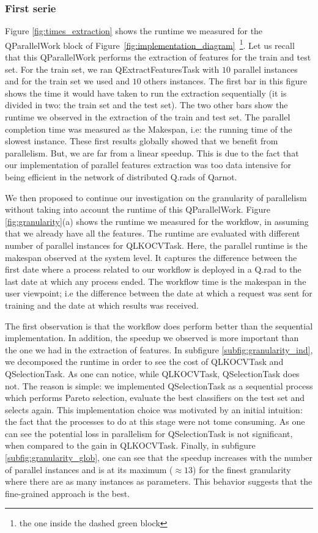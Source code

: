 \documentclass[10pt, conference, compsocconf]{IEEEtran}
\begin{document}
\subsubsection{First serie}

Figure \ref{fig:times_extraction} shows the runtime we measured for the QParallelWork block of 
Figure~\ref{fig:implementation_diagram}~\footnote{the one inside the dashed green block}. 
Let us recall that this QParallelWork performs the extraction of features  for the train and test set. 
For the train set, we ran QExtractFeaturesTask with $10$ parallel instances and for the train set we used and $10$ others instances. 
The first bar in this figure shows the time it would have taken to run the extraction sequentially (it is divided in two: the train set and the test set). The two other bars show the runtime we observed in the extraction of the train and test set. The parallel completion time was 
measured as the Makespan, i.e: the running time of the slowest instance. These first results globally showed that we benefit from parallelism. 
But, we are far from a linear speedup. This is due to the fact that our implementation of parallel features extraction 
was too data intensive for being efficient in the network of distributed Q.rads of Qarnot. 

We then proposed to continue our investigation on the granularity of parallelism without taking into account the runtime 
of this QParallelWork. Figure \ref{fig:granularity}(a) shows the runtime we measured for the workflow, in assuming that we already 
have all the features. The runtime are evaluated  with different number of parallel instances for QLKOCVTask. Here, the parallel runtime 
is the makespan observed at the system level. It captures the difference between the first date where a process related to our 
workflow is deployed in a Q.rad to the last date at which any process ended. 
The workflow time is the makespan in the user viewpoint; i.e the difference between the date at which a request was sent for training 
and the date at which results was received. 

The first observation is that the workflow does perform better than the sequential implementation. 
In addition, the speedup we observed is more important than the one we had in the extraction of features. 
In subfigure \ref{subfig:granularity_ind}, we decomposed the runtime in order to see the cost of QLKOCVTask and QSelectionTask. 
As one can notice, while QLKOCVTask, QSelectionTask does not. The reason is simple: we implemented QSelectionTask as a sequential 
process which performs Pareto selection, evaluate the best classifiers on the test set and selects again. This 
implementation choice was motivated by an initial intuition: the fact that the processes to do at this stage 
were not tome consuming. As one can see the potential loss in parallelism for QSelectionTask is not significant, when compared to the 
gain in QLKOCVTask.  Finally, in subfigure \ref{subfig:granularity_glob}, one can see that the speedup increases with the number of parallel instances and is at its maximum ($\approx 13$) for the finest granularity where there are as many instances as parameters. This behavior 
suggests that the fine-grained approach is the best. 
\end{document}
